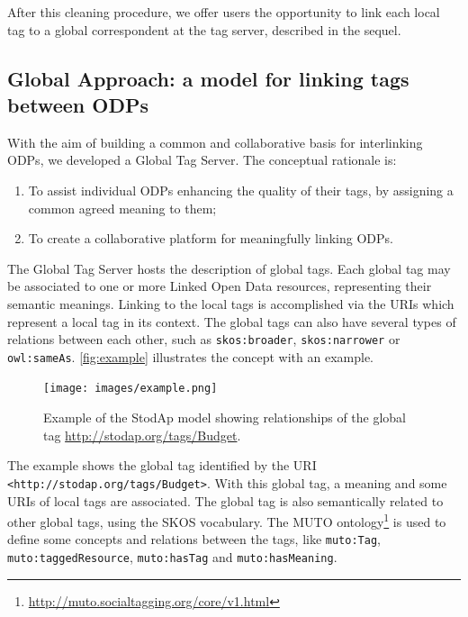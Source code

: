 \documentclass[conference]{IEEEtran}
\begin{document}
After this cleaning procedure, we offer users the opportunity to link each local tag to a global correspondent at the tag server, described in the sequel.

\subsection{Global Approach: a model for linking tags between ODPs}
\label{sec:global}

With the aim of building a common and collaborative basis for interlinking ODPs, we developed a Global Tag Server.
The conceptual rationale is:
\begin{enumerate}
	\item To assist individual ODPs enhancing the quality of their tags, by assigning a common agreed meaning to them;
	\item To create a collaborative platform for meaningfully linking ODPs.
\end{enumerate}

The Global Tag Server hosts the description of global tags.
Each global tag may be associated to one or more Linked Open Data resources, representing their semantic meanings.
Linking to the local tags is accomplished via the URIs which represent a local tag in its context.
The global tags can also have several types of relations between each other, such as \texttt{skos:broader}, \texttt{skos:narrower} or \texttt{owl:sameAs}.
\autoref{fig:example} illustrates the concept with an example.

\begin{figure}[tb]
\begin{center}
\texttt{[image: images/example.png]}
\caption{Example of the StodAp model showing relationships of the global tag \url{http://stodap.org/tags/Budget}.}
\label{fig:example}
\end{center}
\end{figure}

The example shows the global tag identified by the URI \texttt{<http://stodap.org/tags/Budget>}. 
With this global tag, a meaning and some URIs of local tags are associated.
The global tag is also semantically related to other global tags, using the SKOS vocabulary.
The MUTO ontology\footnote{\url{http://muto.socialtagging.org/core/v1.html}} is used to define some concepts and relations between the tags, like \texttt{muto:Tag}, \texttt{muto:taggedResource}, \texttt{muto:hasTag} and \texttt{muto:hasMeaning}.

\end{document}
